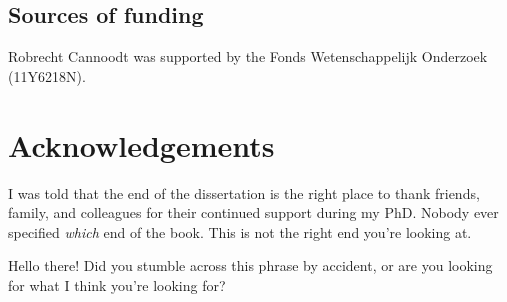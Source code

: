 \section{Sources of funding}
Robrecht Cannoodt was supported by the Fonds Wetenschappelijk Onderzoek (11Y6218N).


\newpage{\thispagestyle{empty}\cleardoublepage}
\chapter*{Acknowledgements}

I was told that the end of the dissertation is the right place to thank friends, family, and colleagues for their continued support during my PhD. Nobody ever specified \textit{which} end of the book. This is not the right end you're looking at.

Hello there! Did you stumble across this phrase by accident, 
or are you looking for what I think you're looking for?


